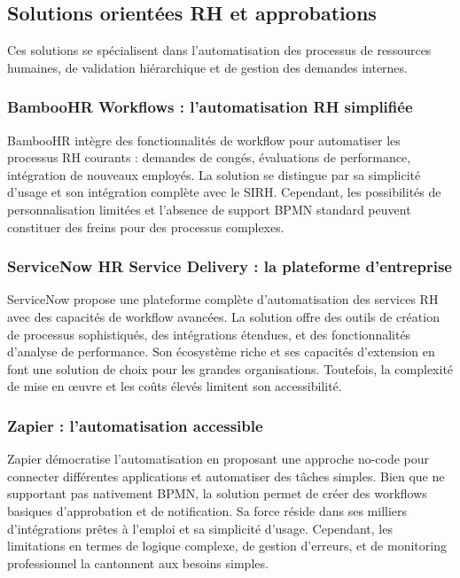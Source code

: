 \subsection{Solutions orientées RH et approbations}

Ces solutions se spécialisent dans l'automatisation des processus de ressources humaines, de validation hiérarchique et de gestion des demandes internes.

\subsubsection{BambooHR Workflows : l'automatisation RH simplifiée}
BambooHR intègre des fonctionnalités de workflow pour automatiser les processus RH courants : demandes de congés, évaluations de performance, intégration de nouveaux employés. La solution se distingue par sa simplicité d'usage et son intégration complète avec le SIRH. Cependant, les possibilités de personnalisation limitées et l'absence de support BPMN standard peuvent constituer des freins pour des processus complexes.

\subsubsection{ServiceNow HR Service Delivery : la plateforme d'entreprise}
ServiceNow propose une plateforme complète d'automatisation des services RH avec des capacités de workflow avancées. La solution offre des outils de création de processus sophistiqués, des intégrations étendues, et des fonctionnalités d'analyse de performance. Son écosystème riche et ses capacités d'extension en font une solution de choix pour les grandes organisations. Toutefois, la complexité de mise en œuvre et les coûts élevés limitent son accessibilité.

\subsubsection{Zapier : l'automatisation accessible}
Zapier démocratise l'automatisation en proposant une approche no-code pour connecter différentes applications et automatiser des tâches simples. Bien que ne supportant pas nativement BPMN, la solution permet de créer des workflows basiques d'approbation et de notification. Sa force réside dans ses milliers d'intégrations prêtes à l'emploi et sa simplicité d'usage. Cependant, les limitations en termes de logique complexe, de gestion d'erreurs, et de monitoring professionnel la cantonnent aux besoins simples.

